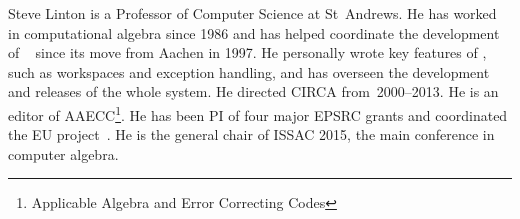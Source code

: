 \begin{participant}[type=leadPI,PM=10,gender=male]{Steve Linton}
  is a Professor of Computer Science at St~Andrews. He has worked in computational algebra
  since 1986 and has helped coordinate the development of \GAP\ %
  since its move from Aachen in 1997. He personally wrote key features of \GAP, such as
  workspaces and exception handling, and has overseen the development and releases of the
  whole system.  He directed CIRCA from~2000--2013. He is an editor of
  AAECC\footnote{Applicable Algebra and Error Correcting Codes}.  He has been PI of four
  major EPSRC grants and coordinated the EU project~\scienceproject. He is the general chair of
  ISSAC 2015, the main conference in computer algebra.
\end{participant}

